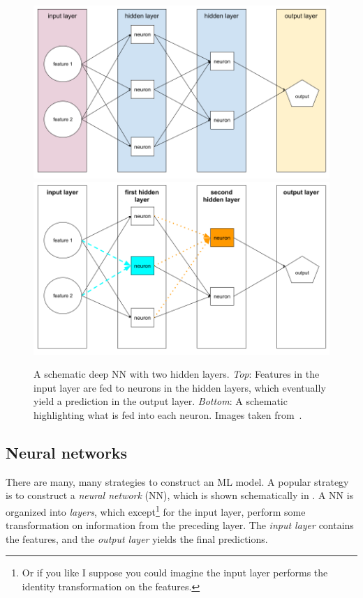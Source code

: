 \begin{figure}
\includegraphics[width=\linewidth]{figs/NeuralNetwork.png}
\includegraphics[width=\linewidth]{figs/Neurons.png}
\caption{A schematic deep NN with two hidden layers.
{\it Top}: Features in the input layer
are fed to neurons in the hidden layers, which eventually yield
a prediction in the output layer. {\it Bottom}: A schematic
highlighting what is fed into each neuron. Images taken 
from~\cite{google_ML}.}
\label{fig:neuralNet}
\end{figure}

\subsection{Neural networks}\label{sec:NN}

There are many, many strategies to construct an ML model.
A popular strategy is to construct a {\it neural network}
(NN), which is shown schematically in . 
A NN is organized into {\it layers}, which except\footnote{Or if you like
I suppose you could imagine the input layer performs the identity
transformation on the features.} for the input layer,
perform some transformation on information from the preceding layer. 
The {\it input layer} contains the features, and
the {\it output layer} yields the final predictions.

